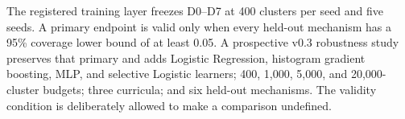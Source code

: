 The registered training layer freezes D0--D7 at 400 clusters per seed and five seeds. A primary endpoint is valid only when every held-out mechanism has a 95\% coverage lower bound of at least 0.05. A prospective v0.3 robustness study preserves that primary and adds Logistic Regression, histogram gradient boosting, MLP, and selective Logistic learners; 400, 1,000, 5,000, and 20,000-cluster budgets; three curricula; and six held-out mechanisms. The validity condition is deliberately allowed to make a comparison undefined.

\begin{table}[t]
  \caption{\textbf{FinAuth-Audit releases multiple validity layers rather than a single aggregate row count.} Counts and boundaries are generated from manifests. Controlled, provenance, external order-book, and actual-model results use separately frozen one-time paper tests; the event-market and mechanistic/training extensions retain their stated validation-only or sealed status.}
  \label{tab:dataset_summary}
  \centering
  \benchmarktableformat
  
\end{table}
